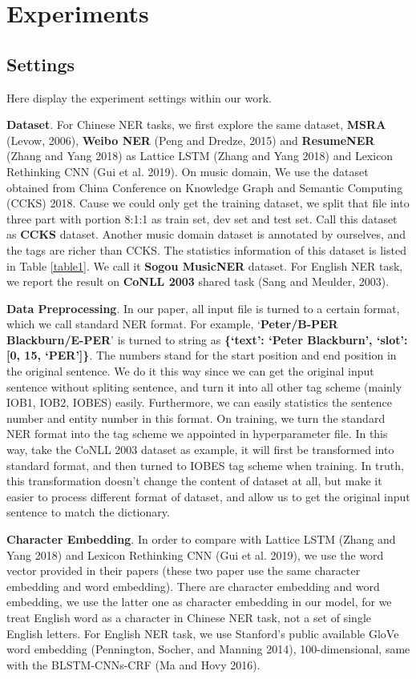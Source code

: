 \documentclass[letterpaper]{article} %
\begin{document}
\section{Experiments}

\subsection{Settings}

Here display the experiment settings within our work.

\textbf{Dataset}. For Chinese NER tasks, we first explore the same dataset, \textbf{MSRA} (Levow, 2006), \textbf{Weibo NER} (Peng and Dredze, 2015) and \textbf{ResumeNER} (Zhang and Yang 2018) as Lattice LSTM (Zhang and Yang 2018) and Lexicon Rethinking CNN (Gui et al. 2019). On music domain, We use the dataset obtained from China Conference on Knowledge Graph and Semantic Computing (CCKS) 2018. Cause we could only get the training dataset,  we split that file into three part with portion 8:1:1 as train set, dev set and test set. Call this dataset as \textbf{CCKS} dataset. Another music domain dataset is annotated by ourselves, and the tags are richer than CCKS. The statistics information of this dataset is listed in Table \ref{table1}. We call it \textbf{Sogou MusicNER} dataset. For English NER task, we report the result on \textbf{CoNLL 2003} shared task (Sang and Meulder, 2003).

\textbf{Data Preprocessing}. In our paper, all input file is turned to a certain format, which we call standard NER format. For example, `\textbf{Peter/B-PER Blackburn/E-PER}' is turned to string as \textbf{\{`text': `Peter Blackburn', `slot': [0, 15, `PER']\}}. The numbers stand for the start position and end position in the original sentence. We do it this way since we can get the original input sentence without spliting sentence, and turn it into all other tag scheme (mainly IOB1, IOB2, IOBES) easily. Furthermore, we can easily statistics the sentence number and entity number in this format. On training, we turn the standard NER format into the tag scheme we appointed in hyperparameter file. In this way, take the CoNLL 2003 dataset as example, it will first be transformed into standard format, and then turned to IOBES tag scheme when training. In truth, this transformation doesn't change the content of dataset at all, but make it easier to process different format of dataset, and allow us to get the original input sentence to match the dictionary.

\textbf{Character Embedding}. In order to compare with Lattice LSTM (Zhang and Yang 2018) and Lexicon Rethinking CNN (Gui et al. 2019), we use the word vector provided in their papers (these two paper use the same character embedding and word embedding). There are character embedding and word embedding, we use the latter one as character embedding in our model, for we treat English word as a character in Chinese NER task, not a set of single English letters. For English NER task, we use Stanford's public available GloVe word embedding (Pennington, Socher, and Manning 2014), 100-dimensional, same with the BLSTM-CNNs-CRF (Ma and Hovy 2016).
\end{document}
